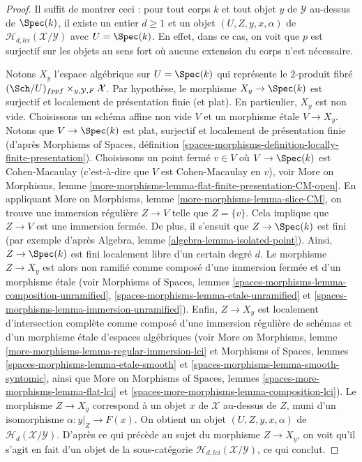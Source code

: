 \begin{proof}
Il suffit de montrer ceci : pour tout corps $k$
et tout objet $y$ de $\mathcal{Y}$ au-dessus de $\Spec(k)$, il existe
un entier $d \geq 1$ et un objet $(U, Z, y, x, \alpha)$ de
$\mathcal{H}_{d, lci}(\mathcal{X}/\mathcal{Y})$ avec $U = \Spec(k)$.
En effet, dans ce cas, on voit que $p$ est surjectif sur les objets au
sens fort où aucune extension du corps n'est nécessaire.

\medskip\noindent
Notons $X_y$ l'espace algébrique sur $U = \Spec(k)$
qui représente le $2$-produit fibré
$(\Sch/U)_{fppf} \times_{y, \mathcal{Y}, F} \mathcal{X}$.
Par hypothèse, le morphisme $X_y \to \Spec(k)$ est surjectif et
localement de présentation finie (et plat). En particulier, $X_y$ est
non vide. Choisissons un schéma affine non vide $V$ et un morphisme étale
$V \to X_y$. Notons que $V \to \Spec(k)$ est plat, surjectif
et localement de présentation finie (d'après
Morphisms of Spaces,
définition \ref{spaces-morphisms-definition-locally-finite-presentation}).
Choisissons un point fermé $v \in V$ où $V \to \Spec(k)$ est Cohen-Macaulay
(c'est-à-dire que $V$ est Cohen-Macaulay en $v$), voir
More on Morphisms,
lemme \ref{more-morphisms-lemma-flat-finite-presentation-CM-open}.
En appliquant
More on Morphisms,
lemme \ref{more-morphisms-lemma-slice-CM},
on trouve une immersion régulière $Z \to V$ telle que $Z = \{v\}$.
Cela implique que $Z \to V$ est une immersion fermée. De plus, il s'ensuit que
$Z \to \Spec(k)$ est fini (par exemple d'après
Algebra, lemme \ref{algebra-lemma-isolated-point}).
Ainsi, $Z \to \Spec(k)$ est fini localement libre d'un certain degré $d$.
Le morphisme $Z \to X_y$ est alors non ramifié comme composé
d'une immersion fermée et d'un morphisme étale
(voir
Morphisms of Spaces, lemmes \ref{spaces-morphisms-lemma-composition-unramified},
\ref{spaces-morphisms-lemma-etale-unramified} et
\ref{spaces-morphisms-lemma-immersion-unramified}).
Enfin, $Z \to X_y$ est localement d'intersection complète
comme composé d'une immersion régulière de schémas et d'un morphisme
étale d'espaces algébriques (voir
More on Morphisms, lemme \ref{more-morphisms-lemma-regular-immersion-lci}
et
Morphisms of Spaces, lemmes \ref{spaces-morphisms-lemma-etale-smooth} et
\ref{spaces-morphisms-lemma-smooth-syntomic}, ainsi que
More on Morphisms of Spaces,
lemmes \ref{spaces-more-morphisms-lemma-flat-lci} et
\ref{spaces-more-morphisms-lemma-composition-lci}).
Le morphisme $Z \to X_y$ correspond à un objet $x$ de $\mathcal{X}$
au-dessus de $Z$, muni d'un isomorphisme $\alpha : y|_Z \to F(x)$.
On obtient un objet $(U, Z, y, x, \alpha)$ de
$\mathcal{H}_d(\mathcal{X}/\mathcal{Y})$. D'après ce qui précède au sujet
du morphisme $Z \to X_y$, on voit qu'il s'agit en fait d'un objet de la
sous-catégorie $\mathcal{H}_{d, lci}(\mathcal{X}/\mathcal{Y})$, ce qui conclut.
\end{proof}




















